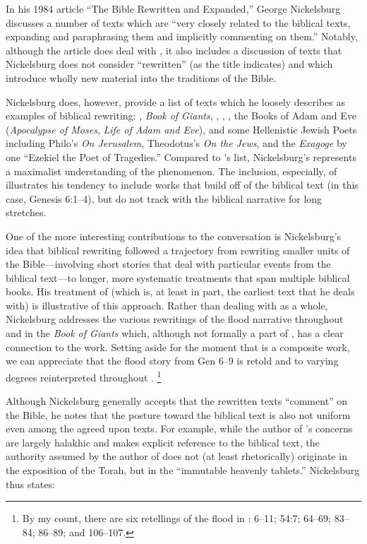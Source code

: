 In his 1984 article ``The Bible Rewritten and Expanded,'' George Nickelsburg discusses a number of texts which are ``very closely related to the biblical texts, expanding and paraphrasing them and implicitly commenting on them.''%
    \autocite[89]{nickelsburg_stone1984}
Notably, although the article does deal with \rwb, it also includes a discussion of texts that Nickelsburg does not consider ``rewritten'' (as the title indicates) and which introduce wholly new material into the traditions of the Bible.%
    \autocite[89--90]{nickelsburg_stone1984}

Nickelsburg does, however, provide a list of texts which he loosely describes as examples of biblical rewriting: \firstenoch, \emph{Book of Giants}, \jub, \ga, \antiquities, the Books of Adam and Eve (\emph{Apocalypse of Moses}, \emph{Life of Adam and Eve}), and some Hellenistic Jewish Poets including Philo's \emph{On Jerusalem}, Theodotus's \emph{On the Jews}, and the \emph{Exagoge} by one ``Ezekiel the Poet of Tragedies.'' Compared to \vermes's list, Nickelsburg's represents a maximalist understanding of the \rwb phenomenon. The inclusion, especially, of \firstenoch illustrates his tendency to include works that build off of the biblical text (in this case, Genesis 6:1--4), but do not track with the biblical narrative for long stretches. 

One of the more interesting contributions to the conversation is Nickelsburg's idea that biblical rewriting followed a trajectory from rewriting smaller units of the Bible---involving short stories that deal with particular events from the biblical text---to longer, more systematic treatments that span multiple biblical books. His treatment of \firstenoch (which is, at least in part, the earliest text that he deals with) is illustrative of this approach. Rather than dealing with \firstenoch as a whole, Nickelsburg addresses the various rewritings of the flood narrative throughout \firstenoch and in the \emph{Book of Giants} which, although not formally a part of \firstenoch, has a clear connection to the work.%
    \autocite[90--97]{nickelsburg_stone1984}
Setting aside for the moment that \firstenoch is a composite work, we can appreciate that the flood story from Gen 6--9 is retold and to varying degrees reinterpreted throughout \firstenoch.%
    \footnote{%
        By my count, there   are six retellings of the flood in \firstenoch: 6--11; 54:7; 64--69;   83--84; 86--89; and 106--107.} 

Although Nickelsburg generally accepts that the rewritten texts ``comment'' on the Bible, he notes that the posture toward the biblical text is also not uniform even among the agreed upon \rwb texts. For example, while the author of \jub's concerns are largely halakhic and makes explicit reference to the biblical text, the authority assumed by the author of \jub does not (at least rhetorically) originate in the exposition of the Torah, but in the ``immutable heavenly tablets.''%
    \autocite[100--101]{nickelsburg_stone1984}
Nickelsburg thus states: 

